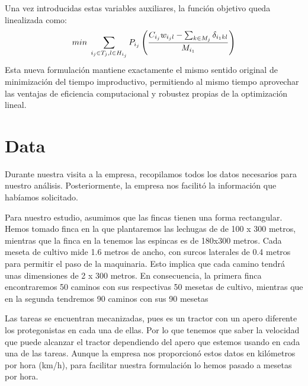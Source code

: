     Una vez introducidas estas variables auxiliares, la función objetivo queda linealizada como:
	\[
        min\hspace{0.1cm} \sum_{i_j \in T_j, l\in H_{i_j}}P_{i_j}\left(\frac{C_{i_j}w_{i_j l}-\sum_{k\in M_j}\delta_{i_1 k l}}{M_{i_1}}\right)
    \]
	Esta nueva formulación mantiene exactamente el mismo sentido original de minimización del tiempo improductivo,
    permitiendo al mismo tiempo aprovechar las ventajas de eficiencia computacional y robustez propias de la optimización lineal.



\chapter*{Data}

Durante nuestra visita a la empresa, recopilamos todos los datos necesarios para nuestro análisis. 
Posteriormente, la empresa nos facilitó la información que habíamos solicitado.

Para nuestro estudio, asumimos que las fincas tienen una forma rectangular. Hemos tomado finca en la que plantaremos las lechugas de
de 100 x 300 metros, mientras que la finca en la tenemos las espincas es de 180x300 metros. Cada meseta de cultivo mide 1.6 metros de ancho, 
con surcos laterales de 0.4 metros para permitir el paso de la maquinaria. Esto implica que cada camino tendrá unas dimensiones de 2 x 300 metros.
En consecuencia, la primera finca encontraremos 50 caminos con sus respectivas 50 mesetas de cultivo, mientras que en la segunda tendremos 
90 caminos con sus 90 mesetas

Las tareas se encuentran mecanizadas, pues es un tractor con un apero diferente los protegonistas en cada una de ellas. Por lo que tenemos 
que saber la velocidad que puede alcanzar el tractor dependiendo del apero que estemos usando en cada una de las tareas. 
 Aunque la empresa nos proporcionó estos datos en kilómetros por hora (km/h), para facilitar nuestra formulación lo hemos pasado a mesetas por hora.

